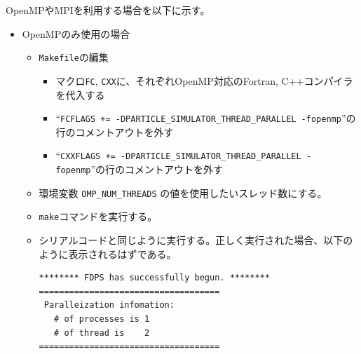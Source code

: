 \documentclass[12pt,a4paper,dvipdfmx]{jarticle}
\begin{document}
OpenMPやMPIを利用する場合を以下に示す。
\begin{itemize}
\item OpenMPのみ使用の場合
  \begin{itemize}
  \item \texttt{Makefile}の編集
    \begin{itemize}
    \item マクロ\texttt{FC}, \texttt{CXX}に、それぞれOpenMP対応のFortran, C++コンパイラを代入する
    \item ``\texttt{FCFLAGS += -DPARTICLE\_SIMULATOR\_THREAD\_PARALLEL -fopenmp}''の行のコメントアウトを外す
    \item ``\texttt{CXXFLAGS += -DPARTICLE\_SIMULATOR\_THREAD\_PARALLEL -fopenmp}''の行のコメントアウトを外す
    \end{itemize}
  \item 環境変数 \texttt{OMP\_NUM\_THREADS} の値を使用したいスレッド数にする。
  \item \texttt{make}コマンドを実行する。
  \item シリアルコードと同じように実行する。正しく実行された場合、以下のように表示されるはずである。
\begin{screen}
\begin{verbatim}
******** FDPS has successfully begun. ********
====================================
 Paralleization infomation:
   # of processes is 1
   # of thread is    2
====================================
\end{verbatim}
\end{screen}
  \end{itemize}


\end{itemize}
\end{document}
